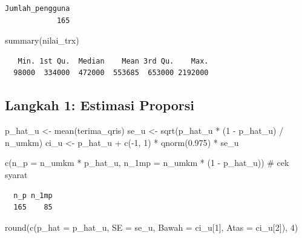 \documentclass[
  indonesian,
  letterpaper,
]{book}
\newenvironment{Shaded}{\begin{snugshade}}{\end{snugshade}}
\newcommand{\AttributeTok}[1]{\textcolor[rgb]{0.40,0.45,0.13}{#1}}
\newcommand{\CommentTok}[1]{\textcolor[rgb]{0.37,0.37,0.37}{#1}}
\newcommand{\DecValTok}[1]{\textcolor[rgb]{0.68,0.00,0.00}{#1}}
\newcommand{\FloatTok}[1]{\textcolor[rgb]{0.68,0.00,0.00}{#1}}
\newcommand{\FunctionTok}[1]{\textcolor[rgb]{0.28,0.35,0.67}{#1}}
\newcommand{\NormalTok}[1]{\textcolor[rgb]{0.00,0.23,0.31}{#1}}
\newcommand{\OtherTok}[1]{\textcolor[rgb]{0.00,0.23,0.31}{#1}}
\newcommand{\SpecialCharTok}[1]{\textcolor[rgb]{0.37,0.37,0.37}{#1}}
\begin{document}
\begin{verbatim}
Jumlah_pengguna 
            165 
\end{verbatim}

\begin{Shaded}
\begin{Highlighting}[]
\FunctionTok{summary}\NormalTok{(nilai\_trx)}
\end{Highlighting}
\end{Shaded}

\begin{verbatim}
   Min. 1st Qu.  Median    Mean 3rd Qu.    Max. 
  98000  334000  472000  553685  653000 2192000 
\end{verbatim}

\subsection{Langkah 1: Estimasi
Proporsi}\label{langkah-1-estimasi-proporsi}

\begin{Shaded}
\begin{Highlighting}[]
\NormalTok{p\_hat\_u }\OtherTok{\textless{}{-}} \FunctionTok{mean}\NormalTok{(terima\_qris)}
\NormalTok{se\_u    }\OtherTok{\textless{}{-}} \FunctionTok{sqrt}\NormalTok{(p\_hat\_u }\SpecialCharTok{*}\NormalTok{ (}\DecValTok{1} \SpecialCharTok{{-}}\NormalTok{ p\_hat\_u) }\SpecialCharTok{/}\NormalTok{ n\_umkm)}
\NormalTok{ci\_u    }\OtherTok{\textless{}{-}}\NormalTok{ p\_hat\_u }\SpecialCharTok{+} \FunctionTok{c}\NormalTok{(}\SpecialCharTok{{-}}\DecValTok{1}\NormalTok{, }\DecValTok{1}\NormalTok{) }\SpecialCharTok{*} \FunctionTok{qnorm}\NormalTok{(}\FloatTok{0.975}\NormalTok{) }\SpecialCharTok{*}\NormalTok{ se\_u}

\FunctionTok{c}\NormalTok{(}\AttributeTok{n\_p =}\NormalTok{ n\_umkm }\SpecialCharTok{*}\NormalTok{ p\_hat\_u, }\AttributeTok{n\_1mp =}\NormalTok{ n\_umkm }\SpecialCharTok{*}\NormalTok{ (}\DecValTok{1} \SpecialCharTok{{-}}\NormalTok{ p\_hat\_u))   }\CommentTok{\# cek syarat}
\end{Highlighting}
\end{Shaded}

\begin{verbatim}
  n_p n_1mp 
  165    85 
\end{verbatim}

\begin{Shaded}
\begin{Highlighting}[]
\FunctionTok{round}\NormalTok{(}\FunctionTok{c}\NormalTok{(}\AttributeTok{p\_hat =}\NormalTok{ p\_hat\_u, }\AttributeTok{SE =}\NormalTok{ se\_u, }\AttributeTok{Bawah =}\NormalTok{ ci\_u[}\DecValTok{1}\NormalTok{], }\AttributeTok{Atas =}\NormalTok{ ci\_u[}\DecValTok{2}\NormalTok{]), }\DecValTok{4}\NormalTok{)}
\end{Highlighting}
\end{Shaded}
\end{document}
